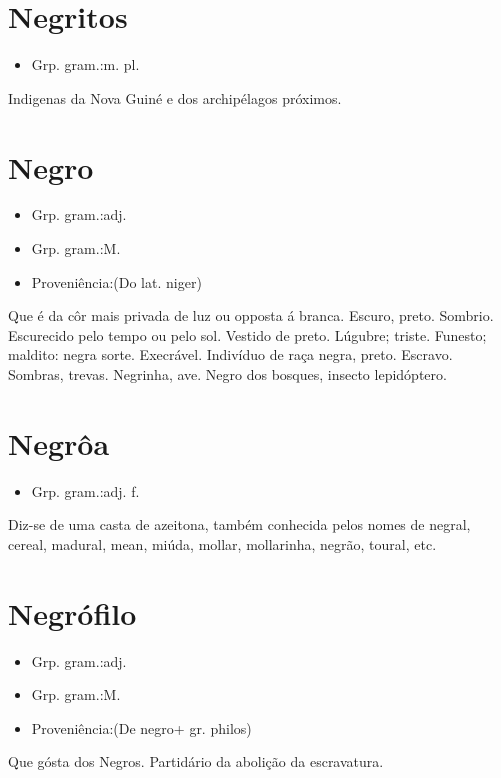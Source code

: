 \section{Negritos}
\begin{itemize}
\item {Grp. gram.:m. pl.}
\end{itemize}
Indigenas da Nova Guiné e dos archipélagos próximos.
\section{Negro}
\begin{itemize}
\item {Grp. gram.:adj.}
\end{itemize}
\begin{itemize}
\item {Grp. gram.:M.}
\end{itemize}
\begin{itemize}
\item {Proveniência:(Do lat. \textunderscore niger\textunderscore )}
\end{itemize}
Que é da côr mais privada de luz ou opposta á branca.
Escuro, preto.
Sombrio.
Escurecido pelo tempo ou pelo sol.
Vestido de preto.
Lúgubre; triste.
Funesto; maldito: \textunderscore negra sorte\textunderscore .
Execrável.
Indivíduo de raça negra, preto.
Escravo.
Sombras, trevas.
Negrinha, ave.
\textunderscore Negro dos bosques\textunderscore , insecto lepidóptero.
\section{Negrôa}
\begin{itemize}
\item {Grp. gram.:adj. f.}
\end{itemize}
Diz-se de uma casta de azeitona, também conhecida pelos nomes de \textunderscore negral\textunderscore , \textunderscore cereal\textunderscore , \textunderscore madural\textunderscore , \textunderscore mean\textunderscore , \textunderscore miúda\textunderscore , \textunderscore mollar\textunderscore , \textunderscore mollarinha\textunderscore , \textunderscore negrão\textunderscore , \textunderscore toural\textunderscore , etc.
\section{Negrófilo}
\begin{itemize}
\item {Grp. gram.:adj.}
\end{itemize}
\begin{itemize}
\item {Grp. gram.:M.}
\end{itemize}
\begin{itemize}
\item {Proveniência:(De \textunderscore negro\textunderscore  + gr. \textunderscore philos\textunderscore )}
\end{itemize}
Que gósta dos Negros.
Partidário da abolição da escravatura.
